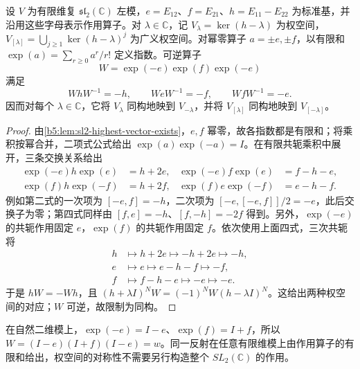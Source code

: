\begin{proposition}\label{b5:prop:sl2-weight-reflection}
	设 \(V\) 为有限维复 \(\mathfrak{sl}_2(\mathbb C)\) 左模，\(e=E_{12}\)、\(f=E_{21}\)、\(h=E_{11}-E_{22}\) 为标准基，并沿用这些字母表示作用算子。对 \(\lambda\in\mathbb C\)，记 \(V_\lambda=\ker(h-\lambda)\) 为权空间，\(V_{[\lambda]}=\bigcup_{j\ge1}\ker(h-\lambda)^j\) 为广义权空间。对幂零算子 \(a=\pm e,\pm f\)，以有限和 \(\exp(a)=\sum_{r\ge0}a^r/r!\) 定义指数。可逆算子
	\[
		W=\exp(-e)\exp(f)\exp(-e)
	\]
	满足
	\[
		WhW^{-1}=-h,\qquad WeW^{-1}=-f,\qquad WfW^{-1}=-e.
	\]
	因而对每个 \(\lambda\in\mathbb C\)，它将 \(V_\lambda\) 同构地映到 \(V_{-\lambda}\)，并将 \(V_{[\lambda]}\) 同构地映到 \(V_{[-\lambda]}\)。
\end{proposition}
\begin{proof}
	由\cref{b5:lem:sl2-highest-vector-exists}，\(e,f\) 幂零，故各指数都是有限和；将乘积按幂合并，二项式公式给出 \(\exp(a)\exp(-a)=I\)。在有限共轭乘积中展开，三条交换关系给出
	\[
		\begin{aligned}
			\exp(-e)h\exp(e)&=h+2e,& \exp(-e)f\exp(e)&=f-h-e,\\
			\exp(f)h\exp(-f)&=h+2f,& \exp(f)e\exp(-f)&=e-h-f.
		\end{aligned}
	\]
	例如第二式的一次项为 \([-e,f]=-h\)，二次项为 \([-e,[-e,f]]/2=-e\)，此后交换子为零；第四式同样由 \([f,e]=-h\)、\([f,-h]=-2f\) 得到。另外，\(\exp(-e)\) 的共轭作用固定 \(e\)，\(\exp(f)\) 的共轭作用固定 \(f\)。依次使用上面四式，三次共轭将
	\[
		\begin{aligned}
			h&\longmapsto h+2e\longmapsto -h+2e\longmapsto-h,\\
			e&\longmapsto e\longmapsto e-h-f\longmapsto-f,\\
			f&\longmapsto f-h-e\longmapsto-e\longmapsto-e.
		\end{aligned}
	\]
	于是 \(hW=-Wh\)，且 \((h+\lambda I)^NW=(-1)^NW(h-\lambda I)^N\)。这给出两种权空间的对应；\(W\) 可逆，故限制为同构。
\end{proof}
在自然二维模上，\(\exp(-e)=I-e\)、\(\exp(f)=I+f\)，所以 \(W=(I-e)(I+f)(I-e)=w\)。同一反射在任意有限维模上由作用算子的有限和给出，权空间的对称性不需要另行构造整个 \(SL_2(\mathbb C)\) 的作用。
